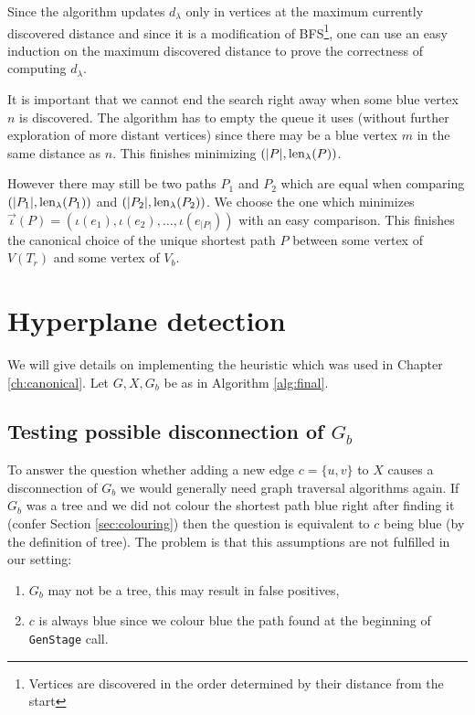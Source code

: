 Since the algorithm updates $d_\lambda$ only in vertices at the maximum currently discovered distance and since it is a modification of BFS\footnote{Vertices are discovered in the order determined by their distance from the start}, one can use an easy induction on the maximum discovered distance to prove the correctness of computing $d_\lambda$.

	It is important that we cannot end the search right away when some blue vertex $n$ is discovered. The algorithm has to empty the queue it uses (without further exploration of more distant vertices) since there may be a blue vertex $m$ in the same distance as $n$. This finishes minimizing $(\lvert P \rvert, \operatorname{len}_\lambda(P))$.

	However there may still be two paths $P_1$ and $P_2$ which are equal when comparing $(\lvert P_1 \rvert, \operatorname{len}_\lambda(P_1))$ and $(\lvert P_2 \rvert, \operatorname{len}_\lambda(P_2))$. We choose the one which minimizes $\vec{\iota}(P) = (\iota(e_1), \iota(e_2),\ldots, \iota(e_{\lvert P \rvert}))$ with an easy comparison. This finishes the canonical choice of the unique shortest path $P$ between some vertex of $V(T_r)$ and some vertex of $V_b$.

\section{Hyperplane detection}

We will give details on implementing the heuristic which was used in Chapter \ref{ch:canonical}. Let $G, X, G_b$ be as in Algorithm \ref{alg:final}.

\subsection*{Testing possible disconnection of $G_b$}

To answer the question whether adding a new edge $c = \{u,v\}$ to $X$ causes a disconnection of $G_b$ we would generally need graph traversal algorithms again. If $G_b$ was a tree and we did not colour the shortest path blue right after finding it (confer Section \ref{sec:colouring}) then the question is equivalent to $c$ being blue (by the definition of tree). The problem is that this assumptions are not fulfilled in our setting:

\begin{enumerate}
	\item $G_b$ may not be a tree, this may result in false positives,
	\item $c$ is always blue since we colour blue the path found at the beginning of \lstinline|GenStage| call.
\end{enumerate}

